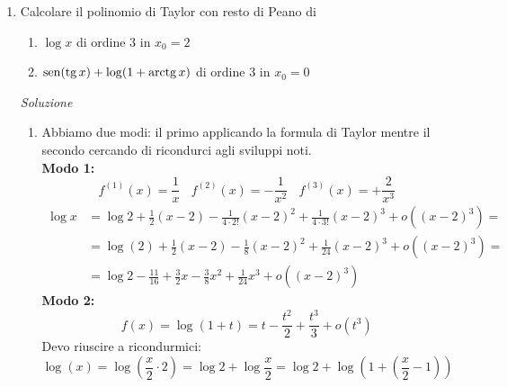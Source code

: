\documentclass{article}
\begin{document}
\begin{enumerate}[label=\textbf{Esercizio 
    8.\arabic*.},itemindent=*]
\begin{enumerate}
        \item Verifichiamo le ipotesi:
        \begin{itemize}
            \item $f(x)=\log(\log(x+1))\underset{x\to0^+}{\longrightarrow}0$
            \item $g(x)=\log x\underset{x\to0^+}{\longrightarrow}0$
            \item $g'(x)\neq 0$ in un intorno destro di $0$, infatti $g'(x)=\frac{1}{x}\neq0~~\forall x\in \R_{>0}$
            \[\lim_{x\to 0^+}\frac{\log(\log(x+1))}{\log x}=\left[ \frac{\infty}{\infty} \right]=\lim_{x\to 0^+}\frac{\frac{1}{x+1}\cdot\frac{1}{\log(x+1)}}{\frac{1}{x}}=\lim_{x\to 0^+}\frac{1}{x+1}\cdot \underbrace{\frac{x}{\log(1+x)}}_{\to 1}\]
        \end{itemize}
    \end{enumerate}
    \item Calcolare il polinomio di Taylor con resto di Peano di
    \begin{enumerate}
        \item $\log x$ di ordine $3$ in $x_0=2$
        \item $\operatorname{sen}(\operatorname{tg} x)+\log (1+\operatorname{arctg} x)$ di ordine $3$ in $x_0=0$
    \end{enumerate}
    \item[\textit{\large Soluzione~}]~
    \begin{enumerate}
        \item Abbiamo due modi: il primo applicando la formula di Taylor mentre il secondo cercando di ricondurci agli sviluppi noti.\\
        \textbf{Modo 1:}
        \[f^{(1)}(x)=\frac{1}{x}~~~~f^{(2)}(x)=-\frac{1}{x^2}~~~~f^{(3)}(x)=+\frac{2}{x^3}\]
        \[\begin{align*}
            \log x & = \log 2+\frac{1}{2}(x-2)-\frac{1}{4\cdot 2!}(x-2)^2+\frac{1}{4\cdot 3!}(x-2)^3+o((x-2)^3)=\\
            &=\log(2)+\frac{1}{2}(x-2)-\frac{1}{8}(x-2)^2+\frac{1}{24}(x-2)^3+o((x-2)^3)=\\
            &=\log 2-\frac{11}{16}+\frac{3}{2}x-\frac{3}{8}x^2+\frac{1}{24}x^3+o((x-2)^3)
        \end{align*}\]
        \textbf{Modo 2:}
        \[f(x)=\log(1+t)=t-\frac{t^2}{2}+\frac{t^3}{3}+o(t^3)\]
        Devo riuscire a ricondurmici:
        \[\log(x)=\log(\frac{x}{2}\cdot 2)=\log2+\log\frac{x}{2}=\log2+\log\left( 1+\left( \frac{x}{2}-1 \right) \right)\]

\end{enumerate}
\end{enumerate}
\end{document}
